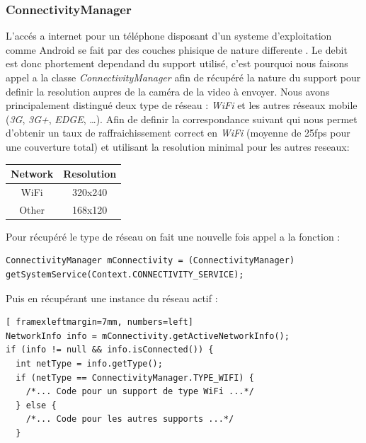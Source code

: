 \subsubsection{ConnectivityManager}
L'accés a internet pour un téléphone disposant d'un systeme d'exploitation
comme Android se fait par des couches phisique de nature differente . Le debit
est donc phortement dependand du support utilisé, c'est pourquoi nous faisons
appel a la classe \textit{ConnectivityManager} afin de récupéré la nature du
support pour definir la resolution aupres de la caméra de la video à envoyer.
Nous avons principalement distingué deux type de réseau : \textit{WiFi} et les
autres réseaux mobile (\textit{3G}, \textit{3G+}, \textit{EDGE}, \ldots).
Afin de definir la correspondance suivant qui nous permet d'obtenir un
taux de raffraichissement correct en \textit{WiFi} (moyenne de 25fps pour une
couverture total) et utilisant la resolution minimal pour les autres reseaux:
\begin{center}
\begin{tabular}{|c|c|}
\hline
Network & Resolution \\
\hline
WiFi &320x240\\
Other &168x120\\
\hline
\end{tabular}
\newline\newline
\end{center}
Pour récupéré le type de réseau on fait une nouvelle fois appel a la
fonction :
\begin{lstlisting}
ConnectivityManager mConnectivity = (ConnectivityManager) getSystemService(Context.CONNECTIVITY_SERVICE);
\end{lstlisting}
Puis en récupérant une instance du réseau actif :
\begin{lstlisting}[ framexleftmargin=7mm, numbers=left]
NetworkInfo info = mConnectivity.getActiveNetworkInfo();
if (info != null && info.isConnected()) {
  int netType = info.getType();
  if (netType == ConnectivityManager.TYPE_WIFI) {
	/*... Code pour un support de type WiFi ...*/
  } else {
	/*... Code pour les autres supports ...*/
  }
\end{lstlisting}

